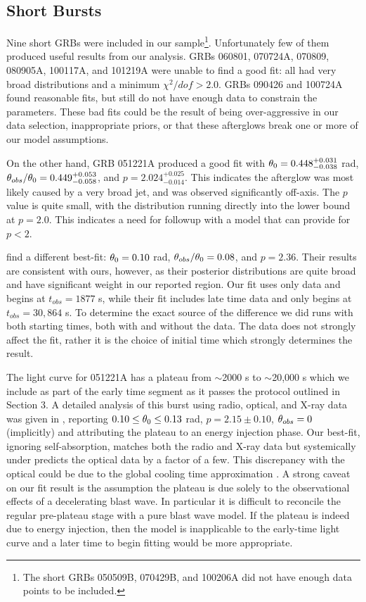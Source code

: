 \subsection{Short Bursts}

Nine short GRBs were included in our sample\footnote{The short GRBs 050509B, 070429B, and 100206A did not have enough data points to be included.}.  Unfortunately few of them produced useful results from our analysis.  GRBs 060801, 070724A, 070809, 080905A, 100117A, and 101219A were unable to find a good fit: all had very broad distributions and a minimum $\chi^2/dof  > 2.0$.  GRBs 090426 and 100724A found reasonable fits, but still do not have enough data to constrain the parameters.  These bad fits could be the result of being over-aggressive in our data selection, inappropriate priors, or that these afterglows break one or more of our model assumptions.  

On the other hand, GRB 051221A produced a good fit with $\theta_0 = 0.448^{+0.031}_{-0.038}$ rad, $\theta_{obs}/\theta_0 = 0.449^{+0.053}_{-0.058}$, and $p = 2.024^{+0.025}_{-0.014}$.  This indicates the afterglow was most likely caused by a very broad jet, and was observed significantly off-axis.  The $p$ value is quite small, with the distribution running directly into the lower bound at $p = 2.0$.  This indicates a need for followup with a model that can provide for $p < 2$.

\citet{Zhang15} find a different best-fit: $\theta_0 = 0.10$ rad, $\theta_{obs}/\theta_0 = 0.08$, and $p=2.36$.  Their results are consistent with ours, however, as their posterior distributions are quite broad and have significant weight in our reported region.  Our fit uses only \swiftXRT{} data and begins at $t_{obs} = 1877$ s, while their fit includes late time \chandra{} data and only begins at $t_{obs} = 30,864$ s.  To determine the exact source of the difference we did runs with both starting times, both with and without the \chandra{} data.  The \chandra{} data does not strongly affect the fit, rather it is the choice of initial time which strongly determines the result.  

The light curve for 051221A has a plateau from $\sim$2000 s to $\sim$20,000 s which we include as part of the early time segment as it passes the protocol outlined in Section 3.  A detailed analysis of this burst using radio, optical, and X-ray data was given in \citet{Soderberg06}, reporting $0.10 \leq \theta_0 \leq 0.13$ rad, $p = 2.15 \pm 0.10$, $\theta_{obs}=0$ (implicitly) and attributing the plateau to an energy injection phase.  Our best-fit, ignoring self-absorption, matches both the radio and X-ray data but systemically under predicts the optical data by a factor of a few.  This discrepancy with the optical could be due to the global cooling time approximation \citep{vanEer10offaxis, Guidorzi14}.  A strong caveat on our fit result is the assumption the plateau is due solely to the observational effects of a decelerating blast wave.  In particular it is difficult to reconcile the regular pre-plateau stage with a pure blast wave model.  If the plateau is indeed due to energy injection, then the \scalefit{} model is inapplicable to the early-time light curve and a later time to begin fitting would be more appropriate.  

